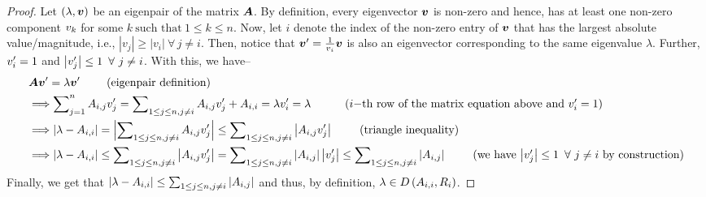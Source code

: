 \documentclass{article}
\begin{document}
\begin{proof}
Let $\left(\lambda, {\bm{v}}\right)$ be an eigenpair of the matrix ${\bm{A}}$. 
By definition, every eigenvector ${\bm{v}}$ is non-zero and hence, has at least one non-zero component ${v}_k$ for some $k\ \text{such that}\ 1\leq k\leq n$.
Now, let $i$ denote the index of the non-zero entry of ${\bm{v}}$ that has the largest absolute value/magnitude, i.e., $\left\lvert v_j\right\rvert \geq \left\lvert v_i\right\rvert\ \forall\, j\ne i$.
Then, notice that ${\bm{v}}^\prime = \frac{1}{ v_i}{\bm{v}}$ is also an eigenvector corresponding to the same eigenvalue $\lambda$.
Further, ${v}_i^\prime = 1$ and $\left\lvert\evv_j^\prime\right\rvert \leq 1\ \forall\, j\ne i$.
With this, we have--
\begin{align*}
    & \mA\vv^\prime = \lambda\vv^\prime\ 
    \tag{eigenpair definition}
    \nonumber\\
    &
    \Longrightarrow
    \sum\nolimits_{j = 1}^n \emA_{i, j}\evv^\prime_j
    =
    \sum\nolimits_{1\leq j\leq n, j\ne i} \emA_{i, j}\evv^\prime_j
    +
    \emA_{i, i}
    =
    \lambda\evv^\prime_i
    =
    \lambda
    \ \ \ 
    \tag{$i-$th row of the matrix equation above and $\evv_i^\prime = 1$}
    \nonumber\\
    &
    \Longrightarrow
    \left\lvert
        \lambda - \emA_{i, i}
    \right\rvert
    =
    \left\lvert
        \sum\nolimits_{1\leq j\leq n, j\ne i} \emA_{i, j}\evv^\prime_j
    \right\rvert
    \leq 
    \sum\nolimits_{1\leq j\leq n, j\ne i}
    \left\lvert
        \emA_{i, j}\evv^\prime_j
    \right\rvert\ 
    \tag{triangle inequality}
    \nonumber\\
    &
    \Longrightarrow
    \left\lvert
        \lambda - \emA_{i, i}
    \right\rvert
    \leq 
    \sum\nolimits_{1\leq j\leq n, j\ne i}
    \left\lvert
        \emA_{i, j}\evv^\prime_j
    \right\rvert
    =
    \sum\nolimits_{1\leq j\leq n, j\ne i}
    \left\lvert
        \emA_{i, j}
    \right\rvert
    \left\lvert
        \evv^\prime_j
    \right\rvert
    \leq 
    \sum\nolimits_{1\leq j\leq n, j\ne i}
    \left\lvert
        \emA_{i, j}
    \right\rvert\ 
    \tag{we have $\left\lvert\evv_j^\prime\right\rvert \leq 1\ \forall\, j\ne i$ by construction}
\end{align*}
Finally, we get that 
$
    \left\lvert
        \lambda - {A}_{i, i}
    \right\rvert
    \leq 
    \sum\nolimits_{1\leq j\leq n, j\ne i}
    \left\lvert
        {A}_{i, j}
    \right\rvert
$
and thus, by definition, $\lambda\in D\left({A}_{i, i}, R_i\right)$.
\end{proof}
\end{document}
